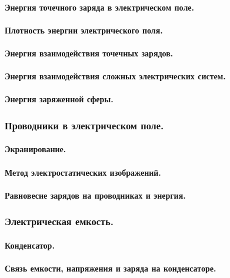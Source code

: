 \documentclass{article}
\begin{document}
            \paragraph{Энергия точечного заряда в электрическом поле.}
            \paragraph{Плотность энергии электрического поля.}
            \paragraph{Энергия взаимодействия точечных зарядов.}
            \paragraph{Энергия взаимодействия сложных электрических систем.}
            \paragraph{Энергия заряженной сферы.}
        \subsubsection{Проводники в электрическом поле.}
            \paragraph{Экранирование.}
            \paragraph{Метод электростатических изображений.}
            \paragraph{Равновесие зарядов на проводниках и энергия.}
        \subsubsection{Электрическая емкость.}
            \paragraph{Конденсатор.}
            \paragraph{Связь емкости, напряжения и заряда на конденсаторе.}
\end{document}
